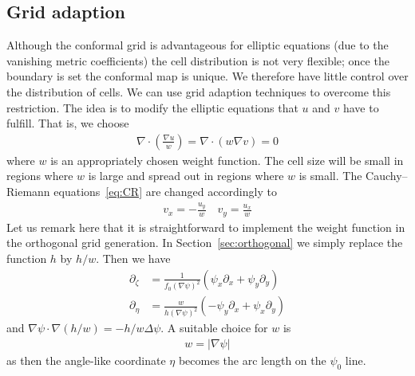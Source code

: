 \documentclass{hitec} %
\begin{document}
\subsection{Grid adaption} \label{sec:adaption}
Although the conformal grid is advantageous for elliptic equations (due to the vanishing metric
coefficients) the cell distribution is not very flexible; once the boundary is set
the conformal map is unique. We therefore have little control over the 
distribution of cells. 
We can use grid adaption techniques to overcome this restriction. 
The idea is to modify the elliptic equations that $u$ and $v$ have 
to fulfill. That is, we choose 
\begin{align}
\nabla\cdot\left( \frac{\nabla u}{w}\right) = \nabla\cdot\left( w \nabla v\right) = 0
\label{eq:adaption}
\end{align}
where $w$ is an appropriately chosen weight function. The 
cell size will be small in regions where $w$ is large and spread out in regions
where $w$ is small.
The Cauchy--Riemann equations~\eqref{eq:CR} are changed accordingly to 
\begin{align}
v_x = -\frac{u_y}{w}\quad v_y = \frac{u_x}{w}
\label{eq:CR_adaption}
\end{align}
Let us remark here that it is straightforward to implement the weight function in the orthogonal grid generation. 
In Section~\ref{sec:orthogonal} we simply replace the function $h$ by $h/w$.
Then we have
\begin{subequations}
\begin{align}
\partial_\zeta &= \frac{1}{f_0(\nabla\psi)^2} (\psi_x\partial_x + \psi_y \partial_y)\\
\partial_\eta &= \frac{w}{h(\nabla\psi)^2} (-\psi_y\partial_x + \psi_x \partial_y)
\end{align}
\end{subequations}
and $\nabla \psi\cdot \nabla (h/w) = -h/w \Delta\psi$.
A suitable choice for $w$ is 
\begin{align}
w = |\nabla\psi|
\label{eq:weight_adaption}
\end{align}
as then the angle-like coordinate $\eta$ becomes the arc length on the $\psi_0$ line. 
\end{document}
